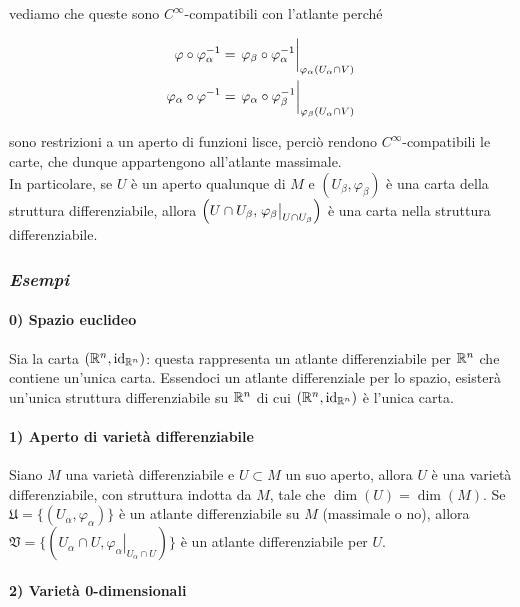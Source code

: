 vediamo che queste sono $ C^{\infty} $-compatibili con l'atlante perché

\begin{align}
	\varphi \circ \varphi_{\alpha}^{-1} = \eval{\varphi_{\beta} \circ \varphi_{\alpha}^{-1}}_{\varphi_{\alpha}(U_{\alpha} \cap V)} \\
	\varphi_{\alpha} \circ \varphi^{-1} = \eval{\varphi_{\alpha} \circ \varphi_{\beta}^{-1}}_{\varphi_{\beta}(U_{\alpha} \cap V)}
\end{align}

sono restrizioni a un aperto di funzioni lisce, perciò rendono $ C^{\infty} $-compatibili le carte, che dunque appartengono all'atlante massimale. \\
In particolare, se $ U $ è un aperto qualunque di $ M $ e $ (U_{\beta},\varphi_{\beta}) $ è una carta della struttura differenziabile, allora $ \left( U \cap U_{\beta}, \eval{\varphi_{\beta}}_{U \cap U_{\beta}} \right) $ è una carta nella struttura differenziabile.

\subsubsection{\textit{Esempi}}

\paragraph{0) Spazio euclideo}

Sia la carta $ (\mathbb{R}^{n},\operatorname{id}_{\mathbb{R}^{n}}) $: questa rappresenta un atlante differenziabile per $ \mathbb{R}^{n} $ che contiene un'unica carta. Essendoci un atlante differenziale per lo spazio, esisterà un'unica struttura differenziabile su $ \mathbb{R}^{n} $ di cui $ (\mathbb{R}^{n},\operatorname{id}_{\mathbb{R}^{n}}) $ è l'unica carta.

\paragraph{1) Aperto di varietà differenziabile}

Siano $ M $ una varietà differenziabile e $ U \subset M $ un suo aperto, allora $ U $ è una varietà differenziabile, con struttura indotta da $ M $, tale che $ \dim (U) = \dim (M) $. Se $ \mathfrak{U} = \{(U_{\alpha},\varphi_{\alpha})\} $ è un atlante differenziabile su $ M $ (massimale o no), allora $ \mathfrak{V} = \{(U_{\alpha} \cap U,\left. \varphi_{\alpha} \right|_{U_{\alpha} \cap U})\} $ è un atlante differenziabile per $ U $.

\paragraph{2) Varietà 0-dimensionali}

